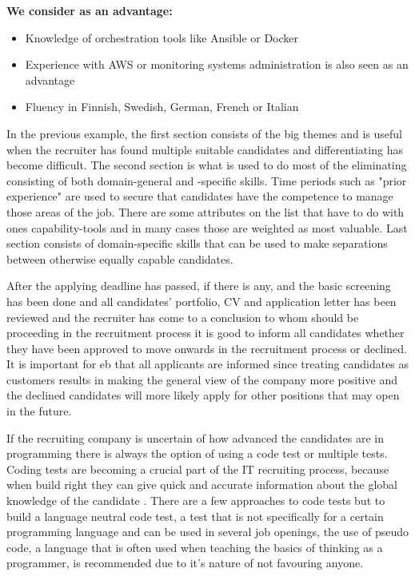 \documentclass[11pt,a4paper,oneside,article]{memoir}
\begin{document}
\textbf{We consider as an advantage:}
\vspace{-17pt} 
\begin{itemize}
\item Knowledge of orchestration tools like Ansible or Docker
\item Experience with AWS or monitoring systems administration is also seen as an advantage
\item Fluency in Finnish, Swedish, German, French or Italian \cite{relex:apply}
\end{itemize}
\vspace{-17pt}

In the previous example, the first section consists of the big themes and is useful when the recruiter has found multiple suitable candidates and differentiating has become difficult. The second section is what is used to do most of the eliminating consisting of both domain-general and -specific skills. Time periods such as "prior experience" are used to secure that candidates have the competence to manage those areas of the job. There are some attributes on the list that have to do with ones capability-tools and in many cases those are weighted as most valuable. Last section consists of domain-specific skills that can be used to make separations between otherwise equally capable candidates.


After the applying deadline has passed, if there is any, and the basic screening has been done and all candidates' portfolio, CV and application letter has been reviewed and the recruiter has come to a conclusion to whom should be proceeding in the recruitment process it is good to inform all candidates whether they have been approved to move onwards in the recruitment process or declined. It is important for \gls{eb} that all applicants are informed since treating candidates as customers results in making the general view of the company more positive and the declined candidates will more likely apply for other positions that may open in the future. \cite[p.~32]{mcculler:book}

If the recruiting company is uncertain of how advanced the candidates are in programming there is always the option of using a code test or multiple tests. Coding tests are becoming a crucial part of the IT recruiting process, because when build right they can give quick and accurate information about the global knowledge of the candidate \cite{winter:blog}. There are a few approaches to code tests but to build a language neutral code test, a test that is not specifically for a certain programming language and can be used in several job openings, the use of pseudo code, a language that is often used when teaching the basics of thinking as a programmer, is recommended due to it's nature of not favouring anyone.
\end{document}
